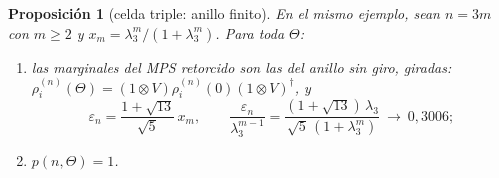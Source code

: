 \documentclass[11pt,a4paper]{article}
\newtheorem{proposicion}[teorema]{Proposición}
\theoremstyle{remark}
\begin{document}
\begin{proposicion}[celda triple: anillo finito]\label{prop:celda3n}
En el mismo ejemplo, sean $n=3m$ con $m\ge2$ y $x_m=\lambda_3^m/(1+\lambda_3^m)$. Para toda
$\Theta$:
\begin{enumerate}
\item[(i)] las marginales del MPS retorcido son las del anillo sin giro, giradas:
  $\rho^{(n)}_i(\Theta)=(1\otimes V)\rho^{(n)}_i(0)(1\otimes V)^\dagger$, y
  \[
    \varepsilon_n=\frac{1+\sqrt{13}}{\sqrt5}\,x_m,\qquad
    \frac{\varepsilon_n}{\lambda_3^{m-1}}=\frac{(1+\sqrt{13})\,\lambda_3}{\sqrt5\,(1+\lambda_3^m)}
    \ \longrightarrow\ 0{,}3006;
  \]
\item[(ii)] $p(n,\Theta)=1$.
\end{enumerate}
\end{proposicion}
\end{document}
